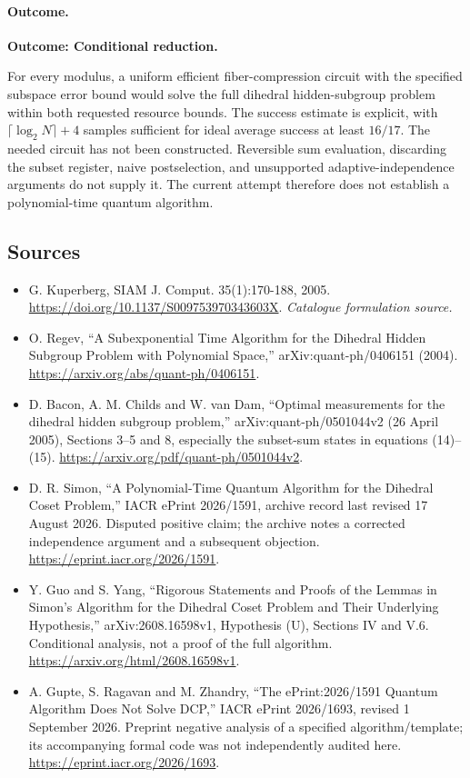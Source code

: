 \documentclass[11pt,a4paper]{article}
\begin{document}
\paragraph{Outcome.}
\textbf{Outcome: Conditional reduction.}

For every modulus, a uniform efficient fiber-compression circuit with the
specified subspace error bound would solve the full dihedral hidden-subgroup
problem within both requested resource bounds. The success estimate is
explicit, with $\lceil\log_2N\rceil+4$ samples sufficient for ideal average
success at least $16/17$. The needed circuit has not been constructed.
Reversible sum evaluation, discarding the subset register, naive
postselection, and unsupported adaptive-independence arguments do not
supply it. The current attempt therefore does not establish a
polynomial-time quantum algorithm.
\subsection{Sources}
\begin{itemize}\raggedright
\item[\textnormal{[S1]}]\hypertarget{source:216:1}{} G. Kuperberg, SIAM J. Comput. 35(1):170-188, 2005.
\url{https://doi.org/10.1137/S009753970343603X}.
{\small\textit{Catalogue formulation source.}}
\item[\textnormal{[E1]}]\hypertarget{extra:216:1}{} O. Regev, ``A Subexponential Time Algorithm for the Dihedral Hidden Subgroup Problem with Polynomial Space,'' arXiv:quant-ph/0406151 (2004).
\url{https://arxiv.org/abs/quant-ph/0406151}.
\item[\textnormal{[E2]}]\hypertarget{extra:216:2}{} D. Bacon, A. M. Childs and W. van Dam, ``Optimal measurements for the dihedral hidden subgroup problem,'' arXiv:quant-ph/0501044v2 (26 April 2005), Sections 3--5 and 8, especially the subset-sum states in equations (14)--(15).
\url{https://arxiv.org/pdf/quant-ph/0501044v2}.
\item[\textnormal{[E3]}]\hypertarget{extra:216:3}{} D. R. Simon, ``A Polynomial-Time Quantum Algorithm for the Dihedral Coset Problem,'' IACR ePrint 2026/1591, archive record last revised 17 August 2026. Disputed positive claim; the archive notes a corrected independence argument and a subsequent objection.
\url{https://eprint.iacr.org/2026/1591}.
\item[\textnormal{[E4]}]\hypertarget{extra:216:4}{} Y. Guo and S. Yang, ``Rigorous Statements and Proofs of the Lemmas in Simon's Algorithm for the Dihedral Coset Problem and Their Underlying Hypothesis,'' arXiv:2608.16598v1, Hypothesis (U), Sections IV and V.6. Conditional analysis, not a proof of the full algorithm.
\url{https://arxiv.org/html/2608.16598v1}.
\item[\textnormal{[E5]}]\hypertarget{extra:216:5}{} A. Gupte, S. Ragavan and M. Zhandry, ``The ePrint:2026/1591 Quantum Algorithm Does Not Solve DCP,'' IACR ePrint 2026/1693, revised 1 September 2026. Preprint negative analysis of a specified algorithm/template; its accompanying formal code was not independently audited here.
\url{https://eprint.iacr.org/2026/1693}.
\end{itemize}
\end{document}
